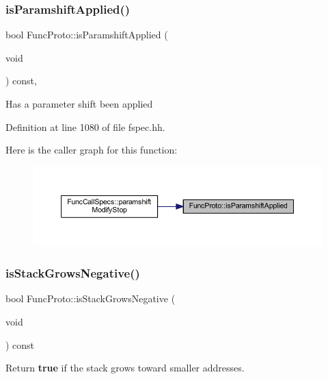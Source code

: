 \subsubsection{\texorpdfstring{isParamshiftApplied()}{isParamshiftApplied()}}
{\footnotesize\ttfamily bool Func\+Proto\+::is\+Paramshift\+Applied (\begin{DoxyParamCaption}\item[{void}]{ }\end{DoxyParamCaption}) const\hspace{0.3cm}{\ttfamily [inline]}, {\ttfamily [protected]}}

Has a parameter shift been applied 

Definition at line 1080 of file fspec.\+hh.

Here is the caller graph for this function\+:
\nopagebreak
\begin{figure}[H]
\begin{center}
\leavevmode
\includegraphics[width=350pt]{class_func_proto_a7b7a58bea827081d275ae6112df7dce5_icgraph}
\end{center}
\end{figure}
\mbox{\label{class_func_proto_a2cb0c5a60d2cfd70462d8e9f75aa9819}} 
\subsubsection{\texorpdfstring{isStackGrowsNegative()}{isStackGrowsNegative()}}
{\footnotesize\ttfamily bool Func\+Proto\+::is\+Stack\+Grows\+Negative (\begin{DoxyParamCaption}\item[{void}]{ }\end{DoxyParamCaption}) const\hspace{0.3cm}{\ttfamily [inline]}}



Return {\bfseries{true}} if the stack grows toward smaller addresses. 



